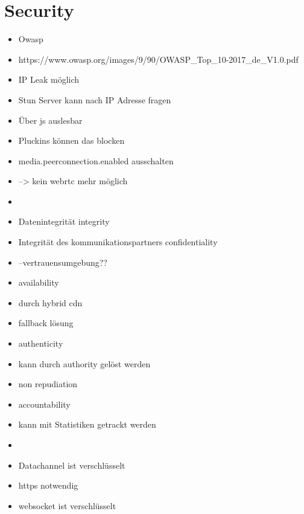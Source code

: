 \section{Security}
\begin{itemize}
	\item Owasp
	\item https://www.owasp.org/images/9/90/OWASP_Top_10-2017_de_V1.0.pdf
	\item IP Leak möglich
	\item Stun Server kann nach IP Adresse fragen
	\item Über js auslesbar
	\item Pluckins können das blocken
	\item media.peerconnection.enabled ausschalten
	\item --> kein webrtc mehr möglich
	\item 
	\item Datenintegrität integrity
	\item Integrität des kommunikationspartners confidentiality
	\item 	--vertrauensumgebung??
	\item availability
	\item durch hybrid cdn 
	\item fallback lösung
	\item authenticity
	\item kann durch authority gelöst werden
	\item non repudiation
	\item accountability
	\item kann mit Statistiken getrackt werden
	\item 
	\item Datachannel ist verschlüsselt
	\item https notwendig
	\item websocket ist verschlüsselt

\end{itemize}

